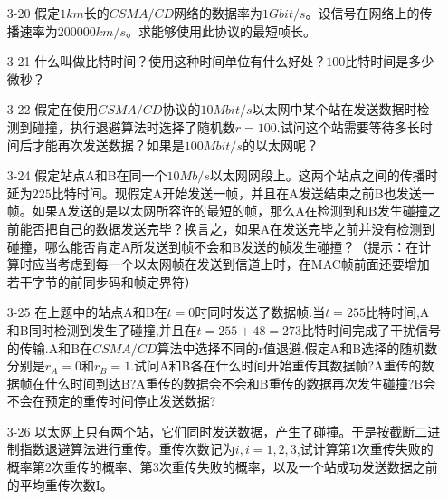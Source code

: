 \documentclass[a4paper,UTF8]{article}
\begin{document}
\begin{enumerate}
\item[3-20] 假定$1km$长的$CSMA/CD$网络的数据率为$1Gbit/s$。设信号在网络上的传播速率为$200000km/s$。求能够使用此协议的最短帧长。
\begin{solution}

\end{solution}

\item[3-21] 什么叫做比特时间？使用这种时间单位有什么好处？$100$比特时间是多少微秒？
\begin{solution}

\end{solution}

\item[3-22] 假定在使用$CSMA/CD$协议的$10Mbit/s$以太网中某个站在发送数据时检测到碰撞，执行退避算法时选择了随机数$r = 100$.试问这个站需要等待多长时间后才能再次发送数据？如果是$100Mbit/s$的以太网呢？
\begin{solution}

\end{solution}

\item[3-24] 假定站点A和B在同一个$10Mb/s$以太网网段上。这两个站点之间的传播时延为$225$比特时间。现假定A开始发送一帧，并且在A发送结束之前B也发送一帧。如果A发送的是以太网所容许的最短的帧，那么A在检测到和B发生碰撞之前能否把自己的数据发送完毕？换言之，如果A在发送完毕之前并没有检测到碰撞，哪么能否肯定A所发送到帧不会和B发送的帧发生碰撞？（提示：在计算时应当考虑到每一个以太网帧在发送到信道上时，在MAC帧前面还要增加若干字节的前同步码和帧定界符） 
\begin{solution}

\end{solution}

\item[3-25] 在上题中的站点A和B在$t=0$时同时发送了数据帧.当$t=255$比特时间,A和B同时检测到发生了碰撞,并且在$t=255+48=273$比特时间完成了干扰信号的传输.A和B在$CSMA/CD$算法中选择不同的r值退避.假定A和B选择的随机数分别是$r_A=0$和$r_B=1$.试问A和B各在什么时间开始重传其数据帧?A重传的数据帧在什么时间到达B?A重传的数据会不会和B重传的数据再次发生碰撞?B会不会在预定的重传时间停止发送数据?
\begin{solution}

\end{solution}

\item[3-26] 以太网上只有两个站，它们同时发送数据，产生了碰撞。于是按截断二进制指数退避算法进行重传。重传次数记为$i,i=1,2,3$,试计算第1次重传失败的概率第2次重传的概率、第3次重传失败的概率，以及一个站成功发送数据之前的平均重传次数I。 
\begin{solution}


\end{solution}
\end{enumerate}
\end{document}
